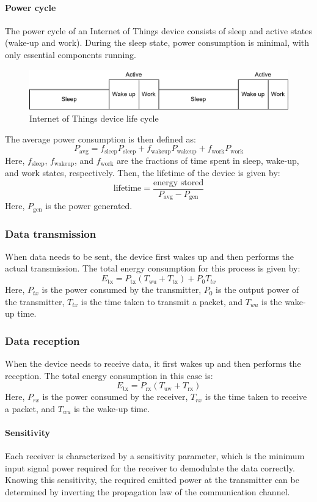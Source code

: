 \paragraph*{Power cycle}
The power cycle of an Internet of Things device consists of sleep and active states (wake-up and work). 
During the sleep state, power consumption is minimal, with only essential components running.
\begin{figure}[H]
    \centering
    \includegraphics[width=0.75\linewidth]{images/iot3.png}
    \caption{Internet of Things device life cycle}
\end{figure}
\noindent The average power consumption is then defined as:
\[P_{\text{avg}}=f_{\text{sleep}}P_{\text{sleep}}+f_{\text{wakeup}}P_{\text{wakeup}}+f_{\text{work}}P_{\text{work}}\]
Here, $f_{\text{sleep}}$, $f_{\text{wakeup}}$, and $f_{\text{work}}$ are the fractions of time spent in sleep, wake-up, and work states, respectively.
Then, the lifetime of the device is given by:
\[\text{lifetime}=\dfrac{\text{energy stored}}{P_{\text{avg}}-P_{\text{gen}}}\]
Here, $P_{\text{gen}}$ is the power generated.

\subsubsection{Data transmission}
When data needs to be sent, the device first wakes up and then performs the actual transmission. 
The total energy consumption for this process is given by:
\[E_\text{tx}=P_\text{tx}(T_\text{wu}+T_\text{tx})+P_0T_{tx}\]
\noindent Here, $P_{tx}$ is the power consumed by the transmitter, $P_0$ is the output power of the transmitter, $T_{tx}$ is the time taken to transmit a packet, and $T_{wu}$ is the wake-up time.

\subsubsection{Data reception}
When the device needs to receive data, it first wakes up and then performs the reception. 
The total energy consumption in this case is:
\[E_\text{tx}=P_\text{rx}(T_\text{uw}+T_\text{rx})\]
Here, $P_{rx}$ is the power consumed by the receiver, $T_{rx}$ is the time taken to receive a packet, and $T_{wu}$ is the wake-up time.

\paragraph*{Sensitivity}
Each receiver is characterized by a sensitivity parameter, which is the minimum input signal power required for the receiver to demodulate the data correctly. 
Knowing this sensitivity, the required emitted power at the transmitter can be determined by inverting the propagation law of the communication channel.

